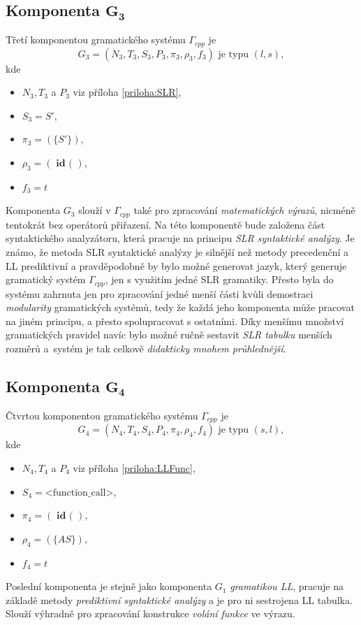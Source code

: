 \subsection*{Komponenta $\textbf{G}_\textbf{3}$}
Třetí komponentou gramatického systému $\Gamma_{cpp}$ je
$$G_3 = (N_3, T_3, S_3, P_3, \pi_3, \rho_3, f_3)\text{ je typu } (l, s),$$ kde
\begin{itemize}
  \item $N_3, T_3$ a $P_3$ viz příloha \ref{priloha:SLR},
  \item $S_3 = S'$,
  \item $\pi_3 = (\{S'\})$,
  \item $\rho_3 = (\textbf{ id} \textbf{ ( })$,
  \item $f_3 = t$
\end{itemize}
Komponenta $G_3$ slouží v $\Gamma_{cpp}$ také pro zpracování \emph{matematických výrazů}, nicméně tentokrát bez operátorů přiřazení. Na této komponentě bude založena část syntaktického analyzátoru,
která pracuje na principu \emph{SLR syntaktické analýzy}. Je známo, že metoda SLR syntaktické analýzy je silnější než metody precedenční a LL prediktivní a pravděpodobně by bylo možné
generovat jazyk, který generuje gramatický systém $\Gamma_{cpp}$, jen s využitím jedné SLR gramatiky. Přesto byla do systému zahrnuta jen pro zpracování jedné menší části kvůli
demostraci \emph{modularity} gramatických systémů, tedy že každá jeho komponenta může pracovat na jiném principu, a přesto spolupracovat s ostatními. Díky menšímu množství gramatických
pravidel navíc bylo možné ručně sestavit \emph{SLR tabulku} menších rozměrů a~systém je tak celkově \emph{didakticky mnohem průhlednější}.

\subsection*{Komponenta $\textbf{G}_\textbf{4}$}
Čtvrtou komponentou gramatického systému $\Gamma_{cpp}$ je
$$G_4 = (N_4, T_4, S_4, P_4, \pi_4, \rho_4, f_4)\text{ je typu } (s, l),$$ kde
\begin{itemize}
  \item $N_4, T_4$ a $P_4$ viz příloha \ref{priloha:LLFunc},
  \item $S_4 = \text{<function\_call>}$,
  \item $\pi_4 =  (\textbf{ id} \textbf{ ( })$,
  \item $\rho_4 = (\{AS\})$,
  \item $f_4 = t$
\end{itemize}
Poslední komponenta je stejně jako komponenta $G_1$ \emph{gramatikou LL}, pracuje na základě metody \emph{prediktivní syntaktické analýzy} a je pro ni sestrojena LL tabulka.
Slouží výhradně pro zpracování konstrukce \emph{volání funkce} ve výrazu.


